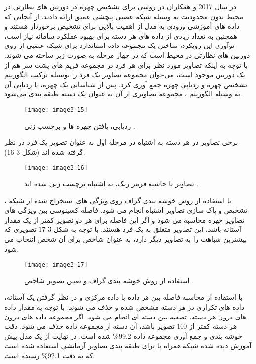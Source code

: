 \noindent
در سال 2017  و همکاران در \cite{7984553} روشی برای تشخیص چهره در دوربین های نظارتی در محیط بدون محدودیت به وسیله شبكه عصبی پیچشی عمیق ارائه دادند. از آنجایی که داده های آموزشی ورودی به مدل از اهمیت بالایی برای تشخیص برخوردار هستند و همچنین به تعداد زیادی از داده های هر دسته برای بهبود عملكرد سامانه نیاز است، نوآوری  این رویکرد، ساختن یک مجموعه داده استاندارد برای شبكه عصبی از روی دوربین های نظارتی در محیط است که در چهار مرحله به صورت زیر ساخته می شوند.
\noindent
با توجه به اینكه تصاویر مورد نظر برای هر فرد در مجموعه فریم های پشت سر هم از یک دوربین موجود است، می-توان مجموعه تصاویر یک فرد را بوسیله ترکیب الگوریتم تشخیص چهره و ردیابی چهره جمع آوری کرد. پس از شناسایی یک چهره، با ردیابی آن به وسیله الگوریتم ، مجموعه تصاویری از آن به عنوان یک دسته طبقه بندی می‌شود.
\begin{figure}[h]
\centering
  \texttt{[image: image3-15]}
  \caption{ردیابی، یافتن چهره ها و برچسب زنی \cite{ref1}.}
  \label{image2-1}
\end{figure}
\noindent
	برخی تصاویر در هر دسته به اشتباه در مرحله اول به عنوان تصویر یک فرد در نظر گرفته شده اند (شکل 3-16).
\begin{figure}[h]
\centering
  \texttt{[image: image3-16]}
  \caption{تصاویر با حاشیه قرمز رنگ، به اشتباه برچسب زنی شده اند \cite{ref1}.}
  \label{image2-1}
\end{figure}
\noindent
با استفاده از روش خوشه بندی گراف  روی ویژگی های استخراج شده از شبكه ، تشخیص و پاک سازی تصاویر اشتباه انجام می شود. فاصله کسینوسی بین ویژگی های تصاویر چهره محاسبه می شود و اگر این فاصله برای هر دو تصویر کمتر از یک مقدار آستانه باشد، این تصاویر متعلق به یک فرد هستند. با توجه به شکل 3-17 تصویری که بیشترین شباهت را به تصاویر دیگر دارد، به عنوان شاخص برای آن شخص انتخاب می شود.
\begin{figure}[h]
\centering
  \texttt{[image: image3-17]}
  \caption{ استفاده از روش خوشه بندی گراف و تعیین تصویر شاخص \cite{ref1}.}
  \label{image2-1}
\end{figure}
\noindent
	با استفاده از محاسبه فاصله بین هر داده با داده مرکزی و در نظر گرفتن یک آستانه، داده های تكراری در هر دسته مشخص شده و حذف  می شوند.
	با توجه به مقدار داده های درون هر دسته، تصفیه بین دسته ای انجام می شود. اگر مجموعه داده های درون هر دسته کمتر از 100 تصویر باشد، آن دسته از مجموعه داده حذف می شود.
دقت خوشه بندی و جمع آوری مجموعه داده 99.2\% شده است. در نهایت از یک مدل پیش آموزش دیده شده شبكه  همراه با  برای طبقه بندی تصاویر آزمایشی استفاده شده است که به دقت 92.1\% رسیده است.

